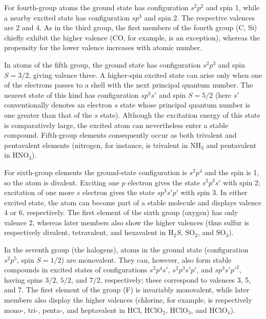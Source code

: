 For fourth-group atoms the ground state has configuration $s^2p^2$ and spin 1, while a nearby excited state has configuration $sp^3$ and spin 2. The respective valences are 2 and 4. As in the third group, the first members of the fourth group (C, Si) chiefly exhibit the higher valence (CO, for example, is an exception), whereas the propensity for the lower valence increases with atomic number.

In atoms of the fifth group, the ground state has configuration $s^2p^3$ and spin $S=3/2$, giving valence three. A higher-spin excited state can arise only when one of the electrons passes to a shell with the next principal quantum number. The nearest state of this kind has configuration $sp^3s'$ and spin $S=5/2$ (here $s'$ conventionally denotes an electron $s$ state whose principal quantum number is one greater than that of the $s$ state). Although the excitation energy of this state is comparatively large, the excited atom can nevertheless enter a stable compound. Fifth-group elements consequently occur as both trivalent and pentavalent elements (nitrogen, for instance, is trivalent in $\mathrm{NH}_3$ and pentavalent in $\mathrm{HNO}_3$).

For sixth-group elements the ground-state configuration is $s^2p^4$ and the spin is 1, so the atom is divalent. Exciting one $p$ electron gives the state $s^2p^3s'$ with spin 2; excitation of one more $s$ electron gives the state
$sp^3s'p'$ with spin 3. In either excited state, the atom can become part of a stable molecule and displays valence 4 or 6, respectively. The first element of the sixth group (oxygen) has only valence 2, whereas later members also show the higher valences (thus sulfur is respectively divalent, tetravalent, and hexavalent in $\mathrm H_2S$, $\mathrm{SO}_2$, and $\mathrm{SO}_3$).

In the seventh group (the halogens), atoms in the ground state (configuration $s^2p^5$, spin $S=1/2$) are monovalent. They can, however, also form stable compounds in excited states of configurations $s^2p^4s'$, $s^2p^3s'p'$, and $sp^3s'p'^2$, having spins $3/2$, $5/2$, and $7/2$, respectively; these correspond to valences 3, 5, and 7. The first element of the group (F) is invariably monovalent, while later members also display the higher valences (chlorine, for example, is respectively mono-, tri-, penta-, and heptavalent in HCl, $\mathrm{HClO}_2$, $\mathrm{HClO}_3$, and $\mathrm{HClO}_4$).

\unskip


